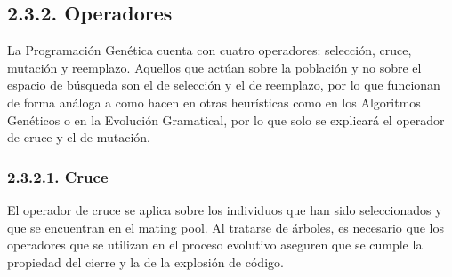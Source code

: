 \documentclass[spanish,a4paper,12pt,twoside]{report}
\begin{document}
    \subsection*{\large 2.3.2. Operadores}
    La Programación Genética cuenta con cuatro operadores: selección, cruce, mutación y reemplazo. Aquellos que actúan sobre la población y no sobre el espacio de búsqueda son el de selección y el de reemplazo, por lo que funcionan de forma análoga a como hacen en otras heurísticas como en los Algoritmos Genéticos o en la Evolución Gramatical, por lo que solo se explicará el operador de cruce y el de mutación.
    
      \subsubsection*{\normalsize 2.3.2.1. Cruce}
      El operador de cruce se aplica sobre los individuos que han sido seleccionados y que se encuentran en el mating pool. Al tratarse de árboles, es necesario que los operadores que se utilizan en el proceso evolutivo aseguren que se cumple la propiedad del cierre y la de la explosión de código. \par
      
\end{document}
